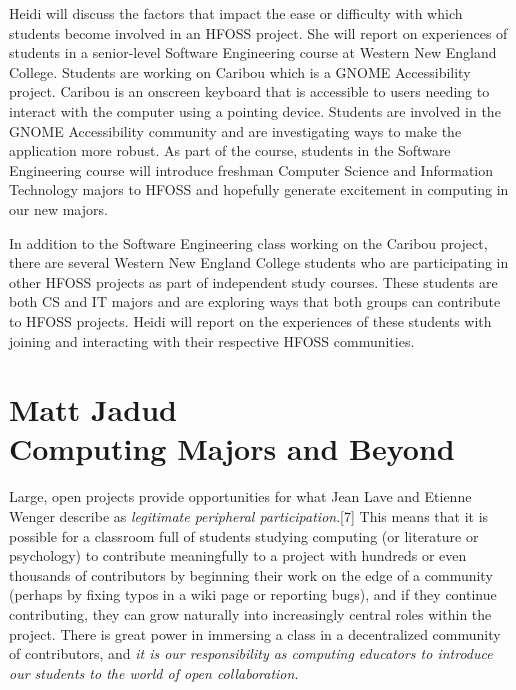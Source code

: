 \documentclass{sig-alternate}
\begin{document}
Heidi will discuss the factors that impact the ease or difficulty with which students become involved in an HFOSS project. She will report on experiences of students in a senior-level Software Engineering course at Western New England College. Students are working on Caribou which is a GNOME Accessibility project. Caribou is an onscreen keyboard that is accessible to users needing to interact with the computer using a pointing device. Students are involved in the GNOME Accessibility community and are investigating ways to make the application more robust. As part of the course, students in the Software Engineering course will introduce freshman Computer Science and Information Technology majors to HFOSS and hopefully generate excitement in computing in our new majors.

In addition to the Software Engineering class working on the Caribou project, there are several Western New England College students who are participating in other HFOSS projects as part of independent study courses. These students are both CS and IT majors and are exploring ways that both groups can contribute to HFOSS projects. Heidi will report on the experiences of these students with joining and interacting with their respective HFOSS communities.  

\section{Matt Jadud\\Computing Majors and Beyond}

Large, open projects provide opportunities for what Jean Lave and Etienne Wenger describe as {\em legitimate peripheral participation}.[7] This means that it is possible for a classroom full of students studying computing (or literature or psychology) to contribute meaningfully to a project with hundreds or even thousands of contributors by beginning their work on the edge of a community (perhaps by fixing typos in a wiki page or reporting bugs), and if they continue contributing, they can grow naturally into increasingly central roles within the project. There is great power in immersing a class in a decentralized community of contributors, and {\em it is our responsibility as computing educators to introduce our students to the world of open collaboration}.
\end{document}

